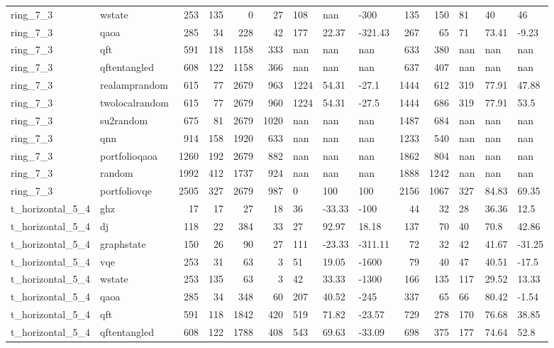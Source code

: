 \begin{longtable}{llrrrrlllrrlll}
ring\_7\_3 & wstate & 253 & 135 & 0 & 27 & 108 & nan & -300 & 135 & 150 & 81 & 40 & 46 \\
ring\_7\_3 & qaoa & 285 & 34 & 228 & 42 & 177 & 22.37 & -321.43 & 267 & 65 & 71 & 73.41 & -9.23 \\
ring\_7\_3 & qft & 591 & 118 & 1158 & 333 & nan & nan & nan & 633 & 380 & nan & nan & nan \\
ring\_7\_3 & qftentangled & 608 & 122 & 1158 & 366 & nan & nan & nan & 637 & 407 & nan & nan & nan \\
ring\_7\_3 & realamprandom & 615 & 77 & 2679 & 963 & 1224 & 54.31 & -27.1 & 1444 & 612 & 319 & 77.91 & 47.88 \\
ring\_7\_3 & twolocalrandom & 615 & 77 & 2679 & 960 & 1224 & 54.31 & -27.5 & 1444 & 686 & 319 & 77.91 & 53.5 \\
ring\_7\_3 & su2random & 675 & 81 & 2679 & 1020 & nan & nan & nan & 1487 & 684 & nan & nan & nan \\
ring\_7\_3 & qnn & 914 & 158 & 1920 & 633 & nan & nan & nan & 1233 & 540 & nan & nan & nan \\
ring\_7\_3 & portfolioqaoa & 1260 & 192 & 2679 & 882 & nan & nan & nan & 1862 & 804 & nan & nan & nan \\
ring\_7\_3 & random & 1992 & 412 & 1737 & 924 & nan & nan & nan & 1888 & 1242 & nan & nan & nan \\
ring\_7\_3 & portfoliovqe & 2505 & 327 & 2679 & 987 & 0 & 100 & 100 & 2156 & 1067 & 327 & 84.83 & 69.35 \\
t\_horizontal\_5\_4 & ghz & 17 & 17 & 27 & 18 & 36 & -33.33 & -100 & 44 & 32 & 28 & 36.36 & 12.5 \\
t\_horizontal\_5\_4 & dj & 118 & 22 & 384 & 33 & 27 & 92.97 & 18.18 & 137 & 70 & 40 & 70.8 & 42.86 \\
t\_horizontal\_5\_4 & graphstate & 150 & 26 & 90 & 27 & 111 & -23.33 & -311.11 & 72 & 32 & 42 & 41.67 & -31.25 \\
t\_horizontal\_5\_4 & vqe & 253 & 31 & 63 & 3 & 51 & 19.05 & -1600 & 79 & 40 & 47 & 40.51 & -17.5 \\
t\_horizontal\_5\_4 & wstate & 253 & 135 & 63 & 3 & 42 & 33.33 & -1300 & 166 & 135 & 117 & 29.52 & 13.33 \\
t\_horizontal\_5\_4 & qaoa & 285 & 34 & 348 & 60 & 207 & 40.52 & -245 & 337 & 65 & 66 & 80.42 & -1.54 \\
t\_horizontal\_5\_4 & qft & 591 & 118 & 1842 & 420 & 519 & 71.82 & -23.57 & 729 & 278 & 170 & 76.68 & 38.85 \\
t\_horizontal\_5\_4 & qftentangled & 608 & 122 & 1788 & 408 & 543 & 69.63 & -33.09 & 698 & 375 & 177 & 74.64 & 52.8 \\

\end{longtable}
